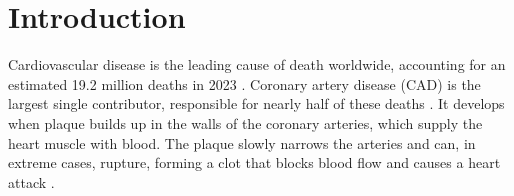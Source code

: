 
\chapter{Introduction}
\label{ch:introduction}
Cardiovascular disease is the leading cause of death worldwide, accounting for an estimated 19.2
million deaths in 2023 \cite{stark2025gbd}.
Coronary artery disease (CAD) is the largest single contributor, responsible for nearly half of
these deaths \cite{stark2025gbd}.
It develops when plaque builds up in the walls of the coronary arteries, which supply the heart
muscle with blood.
The plaque slowly narrows the arteries and can, in extreme cases, rupture, forming a clot that
blocks blood flow and causes a heart attack \cite{libby2019atherosclerosis}.


